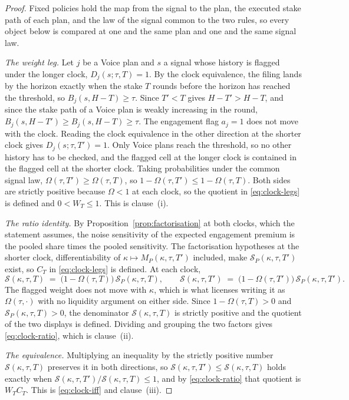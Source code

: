 \begin{proof}
Fixed policies hold the map from the signal to the plan, the executed stake path of each plan, and
the law of the signal common to the two rules, so every object below is compared at one and the
same plan and one and the same signal law.

\emph{The weight leg.} Let $j$ be a Voice plan and $s$ a signal whose history is flagged under the
longer clock, $D_j(s;\tau,T) = 1$. By the clock equivalence, the filing lands by the horizon exactly
when the stake $T$ rounds before the horizon has reached the threshold, so
$B_j(s,H-T) \ge \tau$. Since $T' < T$ gives $H-T' > H-T$, and since the stake path of a Voice plan
is weakly increasing in the round, $B_j(s,H-T') \ge B_j(s,H-T) \ge \tau$. The engagement flag
$a_j = 1$ does not move with the clock. Reading the clock equivalence in the other direction at the
shorter clock gives $D_j(s;\tau,T') = 1$. Only Voice plans reach the threshold, so no other history
has to be checked, and the flagged cell at the longer clock is contained in the flagged cell at the
shorter clock. Taking probabilities under the common signal law, $\Omega(\tau,T') \ge
\Omega(\tau,T)$, so $1 - \Omega(\tau,T') \le 1 - \Omega(\tau,T)$. Both sides are strictly
positive because $\Omega < 1$ at each clock, so the quotient in \eqref{eq:clock-legs} is defined and
$0 < W_T \le 1$. This is clause~(i).

\emph{The ratio identity.} By Proposition~\ref{prop:factorisation} at both clocks, which the
statement assumes, the noise sensitivity of the expected engagement premium is the pooled share
times the pooled sensitivity. The factorisation hypotheses at the shorter clock, differentiability
of $\kappa \mapsto M_P(\kappa,\tau,T')$ included, make $\mathcal S_P(\kappa,\tau,T')$ exist, so
$C_T$ in \eqref{eq:clock-legs} is defined. At each clock,
\[
\mathcal S(\kappa,\tau,T) \;=\; \bigl(1-\Omega(\tau,T)\bigr)\,\mathcal S_P(\kappa,\tau,T),
\qquad
\mathcal S(\kappa,\tau,T') \;=\; \bigl(1-\Omega(\tau,T')\bigr)\,\mathcal S_P(\kappa,\tau,T') .
\]
The flagged weight does not move with $\kappa$, which is what licenses writing it as
$\Omega(\tau,\cdot)$ with no liquidity argument on either side. Since $1-\Omega(\tau,T) > 0$ and
$\mathcal S_P(\kappa,\tau,T) > 0$, the denominator $\mathcal S(\kappa,\tau,T)$ is strictly positive
and the quotient of the two displays is defined. Dividing and grouping the two factors gives
\eqref{eq:clock-ratio}, which is clause~(ii).

\emph{The equivalence.} Multiplying an inequality by the strictly positive number
$\mathcal S(\kappa,\tau,T)$ preserves it in both directions, so
$\mathcal S(\kappa,\tau,T') \le \mathcal S(\kappa,\tau,T)$ holds exactly when
$\mathcal S(\kappa,\tau,T')/\mathcal S(\kappa,\tau,T) \le 1$, and by \eqref{eq:clock-ratio} that
quotient is $W_T C_T$. This is \eqref{eq:clock-iff} and clause~(iii).
\end{proof}

